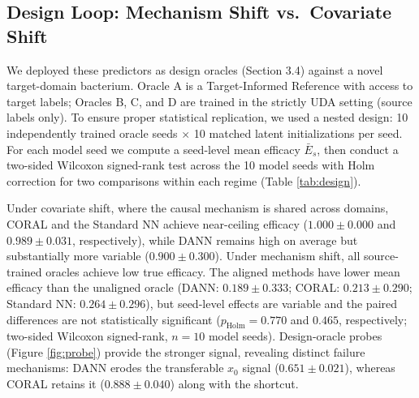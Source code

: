 \documentclass{article}
\begin{document}
\subsection{Design Loop: Mechanism Shift vs.\ Covariate Shift}
We deployed these predictors as design oracles (Section 3.4) against a novel target-domain bacterium. Oracle A is a Target-Informed Reference with access to target labels; Oracles B, C, and D are trained in the strictly UDA setting (source labels only). To ensure proper statistical replication, we used a nested design: 10 independently trained oracle seeds $\times$ 10 matched latent initializations per seed. For each model seed we compute a seed-level mean efficacy $\bar{E}_s$, then conduct a two-sided Wilcoxon signed-rank test across the 10 model seeds with Holm correction for two comparisons within each regime (Table \ref{tab:design}).

\begin{table}[htbp]\footnotesize
\centering
\caption{Design-loop true SCM efficacy under covariate shift (shared mechanism) vs.\ mechanism shift. Model-seed averages (10 seeds $\times$ 10 latent starts). $\Delta \bar{E}$: paired difference vs.\ Standard NN at the model-seed level.}
\label{tab:design}
\end{table}

Under covariate shift, where the causal mechanism is shared across domains, CORAL and the Standard NN achieve near-ceiling efficacy ($1.000 \pm 0.000$ and $0.989 \pm 0.031$, respectively), while DANN remains high on average but substantially more variable ($0.900 \pm 0.300$). Under mechanism shift, all source-trained oracles achieve low true efficacy. The aligned methods have lower mean efficacy than the unaligned oracle (DANN: $0.189 \pm 0.333$; CORAL: $0.213 \pm 0.290$; Standard NN: $0.264 \pm 0.296$), but seed-level effects are variable and the paired differences are not statistically significant ($p_{\text{Holm}} = 0.770$ and $0.465$, respectively; two-sided Wilcoxon signed-rank, $n{=}10$ model seeds). Design-oracle probes (Figure \ref{fig:probe}) provide the stronger signal, revealing distinct failure mechanisms: DANN erodes the transferable $x_0$ signal ($0.651 \pm 0.021$), whereas CORAL retains it ($0.888 \pm 0.040$) along with the shortcut.
\end{document}
